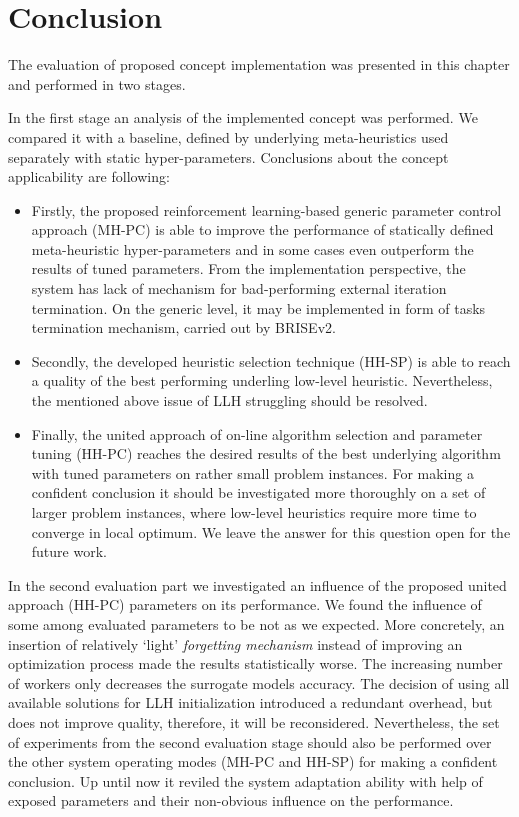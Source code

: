 \section{Conclusion}\label{eval: conclution}
The evaluation of proposed concept implementation was presented in this chapter and performed in two stages.

In the first stage an analysis of the implemented concept was performed. We compared it with a baseline, defined by underlying meta-heuristics used separately with static hyper-parameters. Conclusions about the concept applicability are following:
\begin{itemize}
	\item Firstly, the proposed reinforcement learning-based generic parameter control approach (MH-PC) is able to improve the performance of statically defined meta-heuristic hyper-parameters and in some cases even outperform the results of tuned parameters. From the implementation perspective, the system has lack of mechanism for bad-performing external iteration termination. On the generic level, it may be implemented in form of tasks termination mechanism, carried out by BRISEv2.
	
	\item Secondly, the developed heuristic selection technique (HH-SP) is able to reach a quality of the best performing underling low-level heuristic. Nevertheless, the mentioned above issue of LLH struggling should be resolved.
	
	\item Finally, the united approach of on-line algorithm selection and parameter tuning (HH-PC) reaches the desired results of the best underlying algorithm with tuned parameters on rather small problem instances. For making a confident conclusion it should be investigated more thoroughly on a set of larger problem instances, where low-level heuristics require more time to converge in local optimum. We leave the answer for this question open for the future work. 
\end{itemize}

In the second evaluation part we investigated an influence of the proposed united approach (HH-PC) parameters on its performance. We found the influence of some among evaluated parameters to be not as we expected. More concretely, an insertion of relatively `light' \emph{forgetting mechanism} instead of improving an optimization process made the results statistically worse. The increasing number of workers only decreases the surrogate models accuracy. The decision of using all available solutions for LLH initialization introduced a redundant overhead, but does not improve quality, therefore, it will be reconsidered. Nevertheless, the set of experiments from the second evaluation stage should also be performed over the other system operating modes (MH-PC and HH-SP) for making a confident conclusion. Up until now it reviled the system adaptation ability with help of exposed parameters and their non-obvious influence on the performance.
